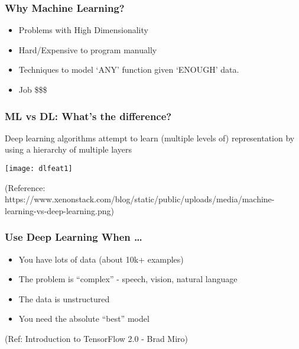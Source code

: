 \begin{frame}[fragile]\frametitle{Why Machine Learning?}
\begin{itemize}
\item Problems with High Dimensionality
\item Hard/Expensive to program manually
\item Techniques to model `ANY' function given `ENOUGH' data.
\item Job \$\$\$
\end{itemize}
\end{frame}



\begin{frame}[fragile] \frametitle{ML vs DL: What's the difference?}
Deep learning algorithms attempt to learn (multiple levels of) representation by using a hierarchy of multiple layers
\begin{center}
\texttt{[image: dlfeat1]}
\end{center}
\tiny{(Reference: https://www.xenonstack.com/blog/static/public/uploads/media/machine-learning-vs-deep-learning.png)}

\end{frame}

\begin{frame}[fragile] \frametitle{Use Deep Learning When \ldots}

\begin{itemize}
\item You have lots of data (about 10k+ examples)
\item The problem is ``complex'' - speech, vision, natural language
\item The data is unstructured 
\item You need the absolute ``best'' model
\end{itemize}
\tiny{(Ref: Introduction to TensorFlow 2.0 - Brad Miro)}
\end{frame}


